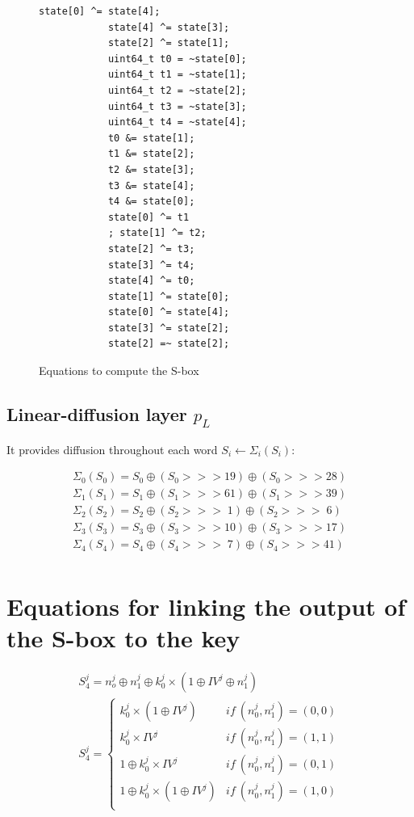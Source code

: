 \documentclass[a4paper,11pt,twocolumn]{article}
\begin{document}
	\begin{figure}[H]
		\centering
		\begin{lstlisting}[style=CStyle]
			state[0] ^= state[4];
			state[4] ^= state[3];
			state[2] ^= state[1];
			uint64_t t0 = ~state[0];
			uint64_t t1 = ~state[1];
			uint64_t t2 = ~state[2];
			uint64_t t3 = ~state[3];
			uint64_t t4 = ~state[4];
			t0 &= state[1];
			t1 &= state[2];
			t2 &= state[3];
			t3 &= state[4];
			t4 &= state[0];
			state[0] ^= t1
			; state[1] ^= t2;
			state[2] ^= t3;
			state[3] ^= t4;
			state[4] ^= t0;
			state[1] ^= state[0];
			state[0] ^= state[4];
			state[3] ^= state[2];
			state[2] =~ state[2];
		\end{lstlisting}
		\caption{Equations to compute the S-box}
		\label{equations_sbox}
	\end{figure}
	
	\subsection{Linear-diffusion layer $p_L$}
	It provides diffusion throughout each word $S_i \leftarrow \Sigma_i(S_i)$:
	
	\begin{gather*}
		\Sigma_0(S_0) = S_0 \oplus (S_0 >>> 19) \oplus (S_0 >>> 28)\\
		\Sigma_1(S_1) = S_1 \oplus (S_1 >>> 61) \oplus (S_1 >>> 39)\\
		\Sigma_2(S_2) = S_2 \oplus (S_2 >>> \;  1) \oplus (S_2 >>> \; 6)\\
		\Sigma_3(S_3) = S_3 \oplus (S_3 >>> 10) \oplus (S_3 >>> 17)\\
		\Sigma_4(S_4) = S_4 \oplus (S_4 >>> \; 7) \oplus (S_4 >>> 41)\\
	\end{gather*}
	
	\section{Equations for linking the output of the S-box to the key} \label{equations}
	\begin{gather*}
		S_4^j = n_o^j \oplus n_1^j \oplus k_0^j \times (1 \oplus IV^j \oplus n_1^j)\\
		S _4^j =\left \{	
		\begin{array}{ll}
			k_0^j \times (1 \oplus IV^j) & if\ (n_0^j,n_1^j)=(0,0)\\
			k_0^j \times IV^j & if\ (n_0^j,n_1^j)=(1,1)\\
			1 \oplus k_0^j \times IV^j & if\ (n_0^j,n_1^j)=(0,1)\\
			1 \oplus k_0^j \times (1 \oplus IV^j) & if\ (n_0^j,n_1^j)=(1,0)\\
		\end{array}
		\right.
	\end{gather*}
	
\end{document}
